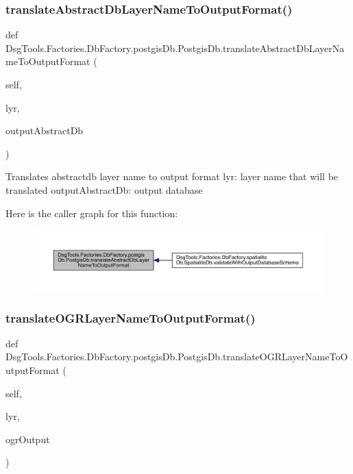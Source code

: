 \subsubsection{\texorpdfstring{translate\+Abstract\+Db\+Layer\+Name\+To\+Output\+Format()}{translateAbstractDbLayerNameToOutputFormat()}}
{\footnotesize\ttfamily def Dsg\+Tools.\+Factories.\+Db\+Factory.\+postgis\+Db.\+Postgis\+Db.\+translate\+Abstract\+Db\+Layer\+Name\+To\+Output\+Format (\begin{DoxyParamCaption}\item[{}]{self,  }\item[{}]{lyr,  }\item[{}]{output\+Abstract\+Db }\end{DoxyParamCaption})}

\begin{DoxyVerb}Translates abstractdb layer name to output format
lyr: layer name that will be translated
outputAbstractDb: output database
\end{DoxyVerb}
 Here is the caller graph for this function\+:
\nopagebreak
\begin{figure}[H]
\begin{center}
\leavevmode
\includegraphics[width=350pt]{class_dsg_tools_1_1_factories_1_1_db_factory_1_1postgis_db_1_1_postgis_db_a76ef724edcd5902e8ebf520d2e77170f_icgraph}
\end{center}
\end{figure}
\mbox{\label{class_dsg_tools_1_1_factories_1_1_db_factory_1_1postgis_db_1_1_postgis_db_a195d2a88eac9832fc26a5a2360170c64}} 
\subsubsection{\texorpdfstring{translate\+O\+G\+R\+Layer\+Name\+To\+Output\+Format()}{translateOGRLayerNameToOutputFormat()}}
{\footnotesize\ttfamily def Dsg\+Tools.\+Factories.\+Db\+Factory.\+postgis\+Db.\+Postgis\+Db.\+translate\+O\+G\+R\+Layer\+Name\+To\+Output\+Format (\begin{DoxyParamCaption}\item[{}]{self,  }\item[{}]{lyr,  }\item[{}]{ogr\+Output }\end{DoxyParamCaption})}

